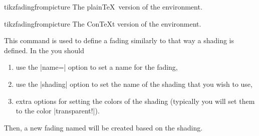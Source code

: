 \begin{plainenvironment}{{tikzfadingfrompicture}}
  The plain\TeX\ version of the environment.
\end{plainenvironment}

\begin{contextenvironment}{{tikzfadingfrompicture}}
  The Con\TeX t version of the environment.
\end{contextenvironment}

\begin{command}{\tikzfading{}}
  This command is used to define a fading similarly to that way a
  shading is defined. In the  you should
  \begin{enumerate}
  \item use the |name=| option to set a name for the fading,
  \item use the |shading| option to set the name of the shading that
    you wish to use,
  \item extra options for setting the colors of the shading (typically
    you will set them to the color |transparent!|).
  \end{enumerate}
  Then, a new fading named  will be created based on the
  shading.

\begin{codeexample}[]
\tikzfading[name=fade right,
            left color=transparent!0,
            right color=transparent!100]

\end{codeexample}

\begin{codeexample}[]
\tikzfading[name=fade out,
            inner color=transparent!0,
            outer color=transparent!100]

\end{codeexample}
\end{command}



